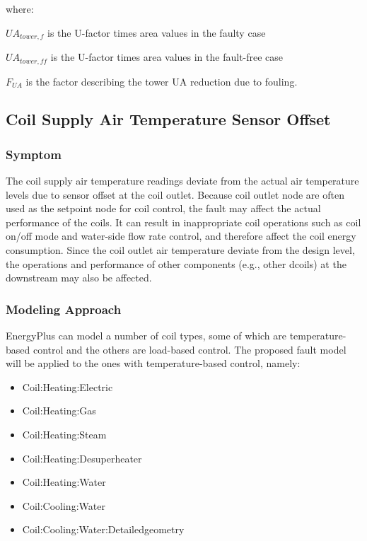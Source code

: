 where:

\(UA_{tower,f}\) is the U-factor times area values in the faulty case

\(UA_{tower,ff}\) is the U-factor times area values in the fault-free case

\(F_{UA}\) is the factor describing the tower UA reduction due to fouling.


\subsection{Coil Supply Air Temperature Sensor Offset}\label{coil-supply-air-temperature-sensor-offset}

\subsubsection{Symptom}

The coil supply air temperature readings deviate from the actual air temperature levels due to sensor offset at the coil outlet. Because coil outlet node are often used as the setpoint node for coil control, the fault may affect the actual performance of the coils. It can result in inappropriate coil operations such as coil on/off mode and water-side flow rate control, and therefore affect the coil energy consumption. Since the coil outlet air temperature deviate from the design level, the operations and performance of other components (e.g., other dcoils) at the downstream may also be affected.

\subsubsection{Modeling Approach}

EnergyPlus can model a number of coil types, some of which are temperature-based control and the others are load-based control. The proposed fault model will be applied to the ones with temperature-based control, namely:

\begin{itemize}
\tightlist
\item
  Coil:Heating:Electric
\item
  Coil:Heating:Gas
\item
  Coil:Heating:Steam
\item
  Coil:Heating:Desuperheater
\item
  Coil:Heating:Water
\item
  Coil:Cooling:Water
\item
  Coil:Cooling:Water:Detailedgeometry
\end{itemize}

